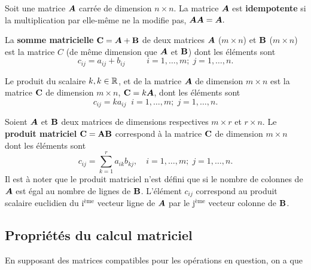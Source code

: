 \begin{defn}
    Soit une matrice $\bm{A}$ carrée de dimension $n\times n$. La matrice $\bm{A}$ est \textbf{idempotente} si la multiplication par elle-même ne la modifie pas,  
     $\bm{A} \bm{A} = \bm{A}.$
\end{defn}

\begin{defn}
La \textbf{somme matricielle} $\bold{C}=\bm{A}+\bold B$ de deux matrices $\bm{A}$ ($m\times n$) et $\bold B$ ($m\times n$) est la matrice $C$ (de même dimension que $\bm{A}$ et $\bold B$) dont les éléments sont
$$c_{ij}=a_{ij}+b_{ij}\qquad\;\;i=1,\ldots,m; \; j=1,\ldots,n.$$
\end{defn}

\begin{defn}
Le produit du scalaire $k, k\in\mathbb{R}$, et de la matrice $\bm{A}$ de dimension $m\times n$ est la matrice $\bold C$ de dimension $m\times n$, $\bold{C}=k\bm{A}$, dont les éléments sont
$$c_{ij}=k a_{ij}\;\;i=1,\ldots,m; \; j=1,\ldots,n.$$
\end{defn}

\begin{defn}
Soient $\bm{A}$ et $\bold B$ deux matrices de dimensions respectives $m\times r$ et $r\times n$. Le \textbf{produit matriciel} $\bold{C}=\bold A\bold B$ correspond à la matrice $\bold C$ de dimension $m\times n$ dont les éléments sont
$$c_{ij}=\sum_{k=1}^r a_{ik}b_{kj}, \quad i=1,\ldots,m; \; j=1,\ldots,n.$$
Il est à noter que le produit matriciel n'est défini que si le nombre de colonnes de $\bm{A}$ est égal au nombre de lignes de $\bold B$. L'élément $c_{ij}$ correspond au produit scalaire euclidien du i$^\text{ème}$ vecteur ligne de $\bm{A}$ par le j$^\text{ème}$ vecteur colonne de $\bold B$.
\end{defn}



\subsection{Propriétés du calcul matriciel}
\label{sec:prop_calc_mat}

En supposant des matrices compatibles pour les opérations en question, on a que

